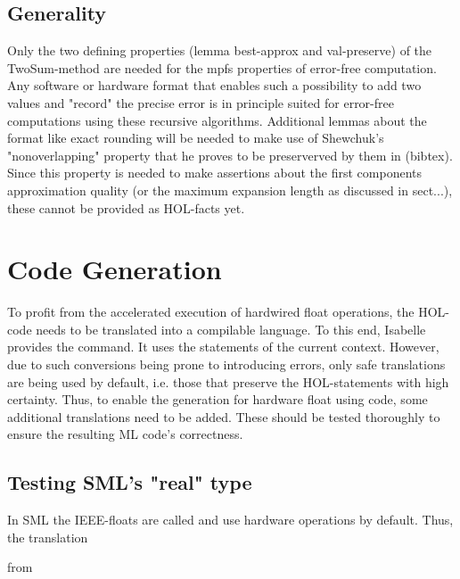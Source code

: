 \documentclass[11pt,a4paper]{article}
\begin{document}
\subsection{Generality}

Only the two defining properties (lemma best-approx and val-preserve) of the TwoSum-method are needed for the mpfs properties of error-free computation. Any software or hardware format that enables such a possibility to add two values and "record" the precise error is in principle suited for error-free computations using these recursive algorithms. Additional lemmas about the format like exact rounding will be needed to make use of Shewchuk's "nonoverlapping" property that he proves to be preserverved by them in (bibtex). Since this property is needed to make assertions about the first components approximation quality (or the maximum expansion length as discussed in sect...), these cannot be provided as HOL-facts yet.

\section{Code Generation}
To profit from the accelerated execution of hardwired float operations, the HOL-code needs to be translated into a compilable language. To this end, Isabelle provides the
command. It uses the 
statements of the current context. However, due to such conversions being prone to introducing errors, only safe translations are being used by default, i.e. those that preserve the HOL-statements with high certainty. Thus, to enable the generation for hardware float using code, some additional translations need to be added. These should be tested thoroughly to ensure the resulting ML code's correctness.

\subsection{Testing SML's "real" type}

In SML the IEEE-floats are called
and use hardware operations by default. Thus, the translation

from
 
\end{document}
